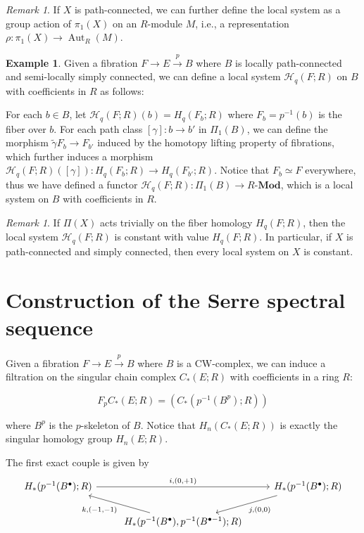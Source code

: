 \documentclass[12pt, reqno]{amsart}
\theoremstyle{definition}
\newtheorem{example}[theorem]{Example}
\theoremstyle{remark}
\newtheorem{remark}[theorem]{Remark}
\numberwithin{equation}{section}
\begin{document}
{\begin{remark}
If $X$ is path-connected, we can further define the local system as a group action of $\pi_1(X)$ on an $R$-module $M$, i.e., a representation $\rho: \pi_1(X) \to \operatorname{Aut}_R(M)$.
\end{remark}

\begin{example}
Given a fibration $F \to E \xrightarrow{p} B$ where $B$ is locally path-connected and semi-locally simply connected, we can define a local system $\mathcal{H}_q(F;R)$ on $B$ with coefficients in $R$ as follows:

For each $b\in B$, let $\mathcal{H}_q(F;R)(b) = H_q(F_b;R)$ where $F_b = p^{-1}(b)$ is the fiber over $b$. For each path class $[\gamma]: b \to b'$ in $\Pi_1(B)$, we can define the morphism $\tilde{\gamma}F_b \to F_{b'}$ induced by the homotopy lifting property of fibrations, which further induces a morphism $\mathcal{H}_q(F;R)([\gamma]): H_q(F_b;R) \to H_q(F_{b'};R)$. Notice that $F_b \simeq F$ everywhere, thus we have defined a functor $\mathcal{H}_q(F;R): \Pi_1(B) \to R$-$\mathbf{Mod}$, which is a local system on $B$ with coefficients in $R$.
\end{example}

\begin{remark}
If $\Pi(X)$ acts trivially on the fiber homology $H_q(F;R)$, then the local system $\mathcal{H}_q(F;R)$ is constant with value $H_q(F;R)$. In particular, if $X$ is path-connected and simply connected, then every local system on $X$ is constant.
\end{remark}


\section{Construction of the Serre spectral sequence}

Given a fibration $F \to E \xrightarrow{p} B$ where $B$ is a CW-complex, we can induce a filtration on the singular chain complex $C_*(E;R)$ with coefficients in a ring $R$:

\[F_p C_*(E;R) = (C_*(p^{-1}(B^p);R)) \]

where $B^p$ is the $p$-skeleton of $B$. Notice that $H_n(C_*(E;R)) $ is exactly the singular homology group $H_n(E;R)$.

The first exact couple is given by
\[
\begin{tikzcd}
H_* (p^{-1}(B^\bullet);R) \arrow[rr, "{i, (0, +1)}"] & & H_* (p^{-1}(B^\bullet);R) \arrow[dl, "{j, (0, 0)}"] \\
& H_* (p^{-1}(B^\bullet), p^{-1}(B^{\bullet-1});R) \arrow[ul, "{k, (-1, -1)}"] &
\end{tikzcd}
\]

}
\end{document}
